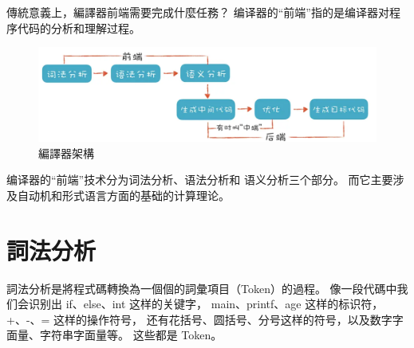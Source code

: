 傳統意義上，編譯器前端需要完成什麼任務？
编译器的“前端”指的是编译器对程序代码的分析和理解过程。

\begin{figure}[htbp]
    \centering
    \includegraphics[scale=0.4]{pics/font1.png}
    \caption{編譯器架構}
    \label{p}
\end{figure}
    

编译器的“前端”技术分为词法分析、语法分析和
语义分析三个部分。
而它主要涉及自动机和形式语言方面的基础的计算理论。


\section{詞法分析}

詞法分析是將程式碼轉換為一個個的詞彙項目（Token）的過程。
像一段代碼中我们会识别出 if、else、int 这样的关键字，
main、printf、age 这样的标识符，+、-、= 这样的操作符号，
还有花括号、圆括号、分号这样的符号，以及数字字面量、字符串字面量等。
这些都是 Token。